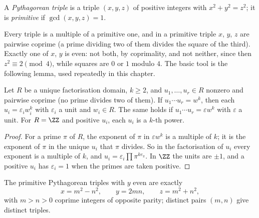 \begin{definition}\label{diophantine-equations:definition-pythagorean}
A \emph{Pythagorean triple} is a triple $(x, y, z)$ of positive integers with $x^2 + y^2 = z^2$; it is \emph{primitive} if $\gcd(x, y, z) = 1$.
\end{definition}

Every triple is a multiple of a primitive one, and in a primitive triple $x$, $y$, $z$ are pairwise coprime (a prime dividing two of them divides the square of the third). Exactly one of $x$, $y$ is even: not
both, by coprimality, and not neither, since then $z^2 \equiv 2 \pmod 4$, while squares are $0$ or $1$ modulo $4$. The basic tool is the following lemma, used repeatedly in this chapter.

\begin{lemma}\label{diophantine-equations:lemma-coprime-powers}
Let $R$ be a unique factorisation domain, $k \geq 2$, and $u_1, \dots, u_r \in R$ nonzero and pairwise coprime (no prime divides two of them). If $u_1 \cdots u_r = w^k$, then each $u_i = \varepsilon_iw_i^k$ with
$\varepsilon_i$ a unit and $w_i \in R$. The same holds if $u_1 \cdots u_r = \varepsilon w^k$ with $\varepsilon$ a unit. For $R = \ZZ$ and positive $u_i$, each $u_i$ is a $k$-th power.
\end{lemma}

\begin{proof}
For a prime $\pi$ of $R$, the exponent of $\pi$ in $\varepsilon w^k$ is a multiple of $k$; it is the exponent of $\pi$ in the unique $u_i$ that $\pi$ divides. So in the factorisation of $u_i$ every exponent is a multiple
of $k$, and $u_i = \varepsilon_i\prod\pi^{k e_\pi}$. In $\ZZ$ the units are $\pm1$, and a positive $u_i$ has $\varepsilon_i = 1$ when the primes are taken positive.
\end{proof}

\begin{theorem}\label{diophantine-equations:theorem-pythagorean}
The primitive Pythagorean triples with $y$ even are exactly
\[
x = m^2 - n^2, \qquad y = 2mn, \qquad z = m^2 + n^2,
\]
with $m > n > 0$ coprime integers of opposite parity; distinct pairs $(m, n)$ give distinct triples.
\end{theorem}

